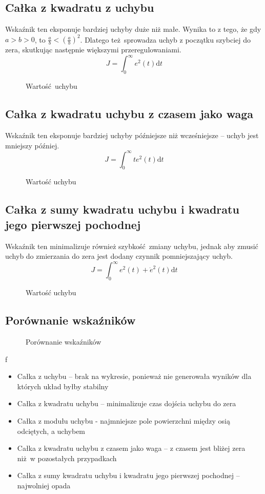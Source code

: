 \documentclass[a4paper, 10pt]{article}
\begin{document}
		\subsection{Całka z kwadratu z uchybu}
			Wskaźnik ten eksponuje bardziej uchyby duże niż małe. Wynika to z tego, że gdy $a > b > 0$, to
			$\frac{a}{b} < \left(\frac{a}{b}\right)^2$. Dlatego też sprowadza uchyb z początku szybciej do zera, skutkując następnie większymi przeregulowaniami.
			$$
				J = \int_0^\infty
				e^2(t) \mathrm{d}t
			$$
			\begin{figure}[H]
				\centering
				\def \svgwidth{0.65\columnwidth}
				
				\caption{Wartość uchybu}
			\end{figure}\noindent
		\subsection{Całka z kwadratu uchybu z czasem jako waga}
			Wskaźnik ten eksponuje bardziej uchyby późniejsze niż wcześniejsze -- uchyb jest mniejszy później.
			$$
				J = \int_0^\infty
				te^2(t) \mathrm{d}t
			$$
			\begin{figure}[H]
				\centering
				\def \svgwidth{0.65\columnwidth}
				
				\caption{Wartość uchybu}
			\end{figure}\noindent
		\subsection{Całka z sumy kwadratu uchybu i kwadratu jego pierwszej pochodnej}
			Wskaźnik ten minimalizuje również szybkość zmiany uchybu, jednak aby zmusić uchyb do zmierzania do zera jest dodany czynnik pomniejszający uchyb.
			$$
				J = \int_0^\infty
				e^2(t) + \dot{e}^2(t)\mathrm{d}t
			$$
			\begin{figure}[H]
				\centering
				\def \svgwidth{0.65\columnwidth}
				
				\caption{Wartość uchybu}
			\end{figure}\noindent
		\subsection{Porównanie wskaźników}
			\begin{figure}[H]
				\centering
				\def \svgwidth{\columnwidth}
				
				\caption{Porównanie wskaźników}
			\end{figure}f\noindent
			\begin{itemize}
				\item[] Całka z uchybu -- brak na wykresie, ponieważ nie generowała wyników dla których układ byłby stabilny
				\item[] Całka z kwadratu uchybu -- minimalizuje czas dojścia uchybu do zera
				\item[] Całka z modułu uchybu - najmniejsze pole powierzchni między osią odciętych, a uchybem
				\item[] Całka z kwadratu uchybu z czasem jako waga -- z czasem jest bliżej zera niż w pozostałych przypadkach
				\item[] Całka z sumy kwadratu uchybu i kwadratu jego pierwszej pochodnej -- najwolniej opada
			\end{itemize}
\end{document}
